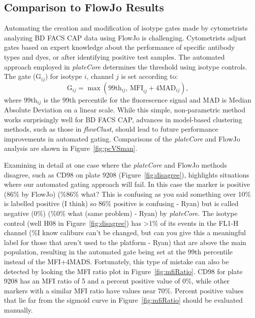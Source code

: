 \documentclass[12pt]{article}
\newcommand{\Rpackage}[1]{{\textit{#1}}}
\begin{document}
\clearpage
\subsection*{Comparison to FlowJo Results}
Automating the creation and modification of isotype gates made by cytometrists
analyzing BD FACS CAP data using FlowJo is challenging. Cytometrists adjust
gates based on expert knowledge about the performance of specific antibody
types and dyes, or after identifying positive test samples. The automated
approach employed in \Rpackage{plateCore} determines the threshold using
isotype controls.  The gate (G$_{ij}$) for isotype $i$, channel $j$ is set
according to:
\begin{equation}
\text{G}_{ij} = \max (\text{99th}_{ij} \text{, MFI}_{ij}+ 4 \text{MAD}_{ij}),
\label{isoGate}
\end{equation}
where 99th$_{ij}$ is the 99th percentile for the fluorescence signal and
MAD is Median Absolute Deviation on a linear scale. 
While this simple, non-parametric method works surprisingly well for BD FACS
CAP, advances in model-based clustering methods, such as those in
\Rpackage{flowClust}, should lead to future performance improvements in
automated gating. Comparisons of the \Rpackage{plateCore} and FlowJo analysis
are shown in Figure~\ref{fig:pcVSman}.

Examining in detail at one case where the \Rpackage{plateCore} and FlowJo
methods disagree, such as CD98 on plate 9208 (Figure~\ref{fig:disagree}),
highlights situations where our automated gating approach will fail. In this
case the marker is positive (86\% by FlowJo) (\%86\% what? This is confusing as
you said something over 10\% is labelled positive (I think) so 86\% positive is
confusing - Ryan) but is  called negative (0\%) (\%0\% what (same problem) -
Ryan) by \Rpackage{plateCore}. The isotype control (well H08 in
Figure~\ref{fig:disagree}) has >1\% of its events in the FL1-H channel (\%I
know caliburs can't be changed, but can you give this a meaningful label for
those that aren't used to the platform - Ryan) that are above the main
population, resulting in the automated gate being set at the 99th percentile
instead of the MFI+4MADS. Fortunately, this type of mistake can also be
detected by looking the MFI ratio plot in Figure~\ref{fig:mfiRatio}. CD98 for
plate 9208 has an MFI ratio of 5 and a percent positive value of 0\%, while
other markers with a similar MFI ratio have values near 70\%. Percent positive
values that lie far from the sigmoid curve in Figure~\ref{fig:mfiRatio} should
be evaluated manually.
\end{document}
